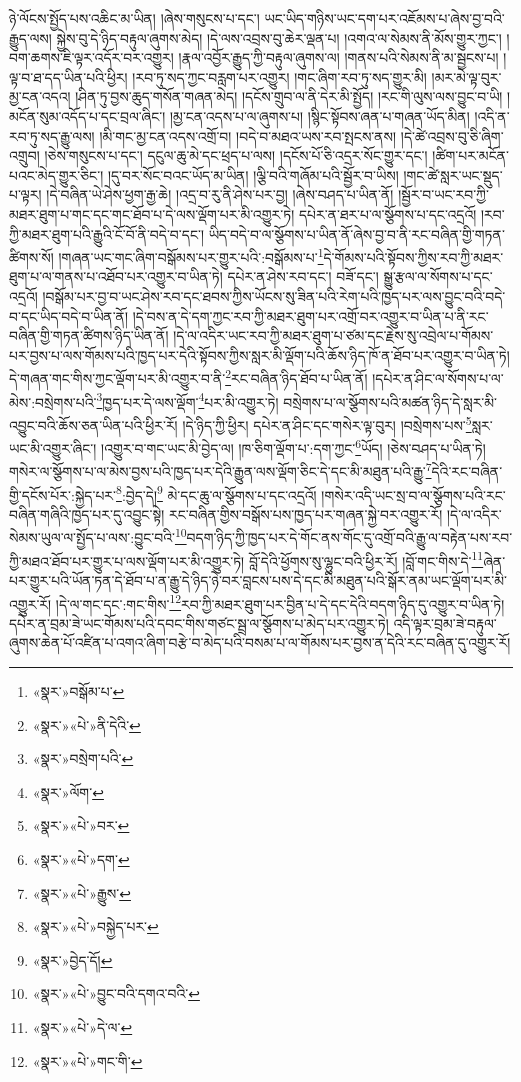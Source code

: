 ཉེ་ལོངས་སྤྱོད་པས་འཆིང་མ་ཡིན། །ཞེས་གསུངས་པ་དང་། ཡང་ཡིད་གཉིས་ཡང་དག་པར་འཇོམས་པ་ཞེས་བྱ་བའི་རྒྱུད་ལས། སྐྱེས་བུ་དེ་ཉིད་བརྟུལ་ཞུགས་མེད། །དེ་ལས་འབྲས་བུ་ཆེར་ལྡན་པ། །འགའ་ལ་སེམས་ནི་མོས་གྱུར་ཀྱང་། །བག་ཆགས་ཇི་ལྟར་འདོར་བར་འགྱུར། །རྣལ་འབྱོར་རྒྱུད་ཀྱི་བརྟུལ་ཞུགས་ལ། །གནས་པའི་སེམས་ནི་མ་སྦྱངས་པ། །ལྟ་བ་ཐ་དད་ཡིན་པའི་ཕྱིར། །རབ་ཏུ་སད་ཀྱང་བརླག་པར་འགྱུར། །གང་ཞིག་རབ་ཏུ་སད་གྱུར་མི། །མར་མེ་ལྟ་བུར་མྱ་ངན་འདའ། །ཤིན་ཏུ་བྱས་ཆུད་གསོན་གཞན་མེད། །དངོས་གྲུབ་ལ་ནི་དེར་མི་སྤྱོད། །རང་གི་ལུས་ལས་བྱུང་བ་ཡི། །མངོན་སུམ་འདོད་པ་དང་བྲལ་ཞིང་། །མྱ་ངན་འདས་པ་ལ་ཞུགས་པ། །སྙིང་སྟོབས་ཞན་པ་གཞན་ཡོད་མིན། །འདི་ན་རབ་ཏུ་སད་རྒྱུ་ལས། །མི་གང་མྱ་ངན་འདས་འགྲོ་བ། །བདེ་བ་མཐའ་ཡས་རབ་སྤངས་ནས། །དེ་ཚེ་འབྲས་བུ་ཅི་ཞིག་འགྲུབ། །ཅེས་གསུངས་པ་དང་། དངུལ་ཆུ་མེ་དང་ཕྲད་པ་ལས། །དངོས་པོ་ཅི་འདྲར་སོང་གྱུར་དང་། །ཚིག་པར་མངོན་པའང་མེད་གྱུར་ཅིང་། །དུ་བར་སོང་བའང་ཡོད་མ་ཡིན། །ལྕི་བའི་གཞོམ་པའི་སྦྱོར་བ་ཡིས། །གང་ཚེ་སླར་ཡང་སྡུད་པ་ལྟར། །དེ་བཞིན་ཡེ་ཤེས་ཕྱག་རྒྱ་ཆེ། །འདྲ་བ་རུ་ནི་ཤེས་པར་བྱ། །ཞེས་བཤད་པ་ཡིན་ནོ། །སྦྱོར་བ་ཡང་རབ་ཀྱི་མཐར་ཐུག་པ་གང་དང་གང་ཐོབ་པ་དེ་ལས་ལྡོག་པར་མི་འགྱུར་ཏེ། དཔེར་ན་ཐར་པ་ལ་སྩོགས་པ་དང་འདྲའོ། །རབ་ཀྱི་མཐར་ཐུག་པའི་རྒྱུའི་ངོ་བོ་ནི་བདེ་བ་དང་། ཡིད་བདེ་བ་ལ་སྩོགས་པ་ཡིན་ནོ་ཞེས་བྱ་བ་ནི་རང་བཞིན་གྱི་གཏན་ཚིགས་སོ། །གཞན་ཡང་གང་ཞིག་བསྒོམས་པར་གྱུར་པའི་:བསྒོམས་པ་\footnote{«སྣར་»བསྒོམ་པ་}དེ་གོམས་པའི་སྟོབས་ཀྱིས་རབ་ཀྱི་མཐར་ཐུག་པ་ལ་གནས་པ་འཐོབ་པར་འགྱུར་བ་ཡིན་ཏེ། དཔེར་ན་ཤེས་རབ་དང་། བཟོ་དང་། སྒྱུ་རྩལ་ལ་སོགས་པ་དང་འདྲའོ། །བསྒོམ་པར་བྱ་བ་ཡང་ཤེས་རབ་དང་ཐབས་ཀྱིས་ཡོངས་སུ་ཟིན་པའི་རེག་པའི་ཁྱད་པར་ལས་བྱུང་བའི་བདེ་བ་དང་ཡིད་བདེ་བ་ཡིན་ནོ། །དེ་བས་ན་དེ་དག་ཀྱང་རབ་ཀྱི་མཐར་ཐུག་པར་འགྲོ་བར་འགྱུར་བ་ཡིན་པ་ནི་རང་བཞིན་གྱི་གཏན་ཚིགས་ཉིད་ཡིན་ནོ། །དེ་ལ་འདིར་ཡང་རབ་ཀྱི་མཐར་ཐུག་པ་ཙམ་དང་རྗེས་སུ་འབྲེལ་པ་གོམས་པར་བྱས་པ་ལས་གོམས་པའི་ཁྱད་པར་དེའི་སྟོབས་ཀྱིས་སླར་མི་ལྡོག་པའི་ཆོས་ཉིད་ཁོ་ན་ཐོབ་པར་འགྱུར་བ་ཡིན་ཏེ། དེ་གཞན་གང་གིས་ཀྱང་ལྡོག་པར་མི་འགྱུར་བ་ནི་\footnote{«སྣར་»«པེ་»ནི་དེའི་}རང་བཞིན་ཉིད་ཐོབ་པ་ཡིན་ནོ། །དཔེར་ན་ཤིང་ལ་སོགས་པ་ལ་མེས་:བསྲེགས་པའི་\footnote{«སྣར་»བསྲེག་པའི་}ཁྱད་པར་དེ་ལས་ལྡོག་\footnote{«སྣར་»ལོག་}པར་མི་འགྱུར་ཏེ། བསྲེགས་པ་ལ་སྩོགས་པའི་མཚན་ཉིད་དེ་སླར་མི་འབྱུང་བའི་ཆོས་ཅན་ཡིན་པའི་ཕྱིར་རོ། །དེ་ཉིད་ཀྱི་ཕྱིར། དཔེར་ན་ཤིང་དང་གསེར་ལྟ་བུར། །བསྲེགས་པས་\footnote{«སྣར་»«པེ་»བར་}སླར་ཡང་མི་འགྱུར་ཞིང་། །འགྱུར་བ་གང་ཡང་མི་བྱེད་ལ། །ཁ་ཅིག་ལྡོག་པ་:དག་ཀྱང་\footnote{«སྣར་»«པེ་»དག་}ཡོད། །ཅེས་བཤད་པ་ཡིན་ཏེ། གསེར་ལ་སྩོགས་པ་ལ་མེས་བྱས་པའི་ཁྱད་པར་དེའི་རྒྱུན་ལས་ལྡོག་ཅིང་དེ་དང་མི་མཐུན་པའི་རྒྱུ་\footnote{«སྣར་»«པེ་»རྒྱུས་}དེའི་རང་བཞིན་གྱི་དངོས་པོར་:སྐྱེད་པར་\footnote{«སྣར་»«པེ་»བསྐྱེད་པར་}:བྱེད་དེ།\footnote{«སྣར་»བྱེད་དོ།} མེ་དང་ཆུ་ལ་སྩོགས་པ་དང་འདྲའོ། །གསེར་འདི་ཡང་སྲ་བ་ལ་སྩོགས་པའི་རང་བཞིན་གཞིའི་ཁྱད་པར་དུ་འབྱུང་སྟེ། རང་བཞིན་གྱིས་བསྒོས་པས་ཁྱད་པར་གཞན་སྐྱེ་བར་འགྱུར་རོ། །དེ་ལ་འདིར་སེམས་ཡུལ་ལ་སྤྱོད་པ་ལས་:བྱུང་བའི་\footnote{«སྣར་»«པེ་»བྱུང་བའི་དགའ་བའི་}བདག་ཉིད་ཀྱི་ཁྱད་པར་དེ་གོང་ནས་གོང་དུ་འགྲོ་བའི་རྒྱུ་ལ་བརྟེན་པས་རབ་ཀྱི་མཐའ་ཐོབ་པར་གྱུར་པ་ལས་ལྡོག་པར་མི་འགྱུར་ཏེ། བློ་དེའི་ཕྱོགས་སུ་ལྷུང་བའི་ཕྱིར་རོ། །བློ་གང་གིས་དེ་\footnote{«སྣར་»«པེ་»དེ་ལ་}ཞེན་པར་གྱུར་པའི་ཡོན་ཏན་དེ་ཐོབ་པ་ན་རྒྱུ་དེ་ཉིད་ཉེ་བར་བླངས་པས་དེ་དང་མི་མཐུན་པའི་སྒོར་ནམ་ཡང་ལྡོག་པར་མི་འགྱུར་རོ། །དེ་ལ་གང་དང་:གང་གིས་\footnote{«སྣར་»«པེ་»གང་གི་}རབ་ཀྱི་མཐར་ཐུག་པར་བྱིན་པ་དེ་དང་དེའི་བདག་ཉིད་དུ་འགྱུར་བ་ཡིན་ཏེ། དཔེར་ན་བྲམ་ཟེ་ཡང་གོམས་པའི་དབང་གིས་གཙང་སྦྲ་ལ་སྩོགས་པ་མེད་པར་འགྱུར་ཏེ། འདི་ལྟར་བྲམ་ཟེ་བརྟུལ་ཞུགས་ཆེན་པོ་འཛིན་པ་འགའ་ཞིག་བརྩེ་བ་མེད་པའི་བསམ་པ་ལ་གོམས་པར་བྱས་ན་དེའི་རང་བཞིན་དུ་འགྱུར་རོ། 